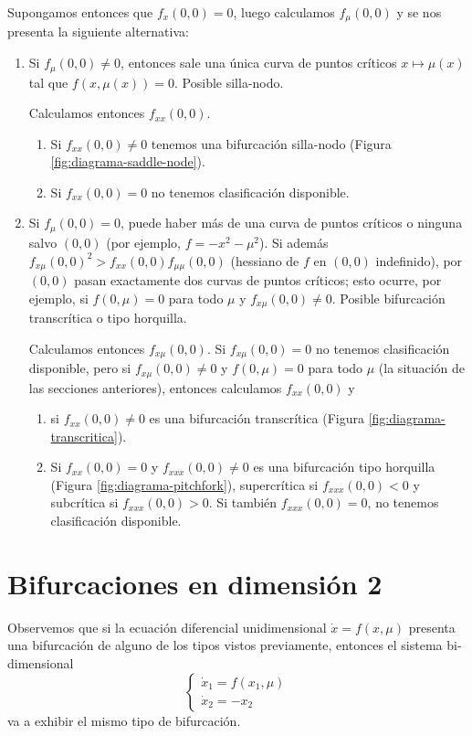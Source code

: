 \documentclass[12pt, a4paper]{amsbook}
\theoremstyle{remark}
\theoremstyle{definition}
\numberwithin{section}{chapter}
\numberwithin{subsection}{section}
\numberwithin{equation}{section}
\numberwithin{figure}{chapter}
\begin{document}
Supongamos entonces que $f_x(0,0)=0$, luego calculamos $f_\mu(0,0)$ y se nos presenta la siguiente alternativa:
\begin{enumerate}
\item Si $f_\mu(0,0)\neq 0$, entonces sale una única curva de puntos críticos $x\mapsto\mu(x)$ tal que $f(x,\mu(x))=0$. Posible silla-nodo.

Calculamos entonces $f_{xx}(0,0)$.
\begin{enumerate}
\item Si $f_{xx}(0,0)\neq 0$ tenemos una bifurcación silla-nodo (Figura \ref{fig:diagrama-saddle-node}).

\item Si $f_{xx}(0,0)=0$ no tenemos clasificación disponible.
\end{enumerate}

\item Si $f_\mu(0,0)=0$, puede haber más de una curva de puntos críticos o ninguna salvo $(0,0)$ (por ejemplo, $f=-x^2-\mu^2$). Si además $f_{x\mu}(0,0)^2>f_{xx}(0,0)f_{\mu\mu}(0,0)$ (hessiano de $f$ en $(0,0)$ indefinido), por $(0,0)$ pasan exactamente dos curvas de puntos críticos; esto ocurre, por ejemplo, si $f(0,\mu)=0$ para todo $\mu$ y $f_{x\mu}(0,0)\neq0$. Posible bifurcación transcrítica o tipo horquilla.

Calculamos entonces $f_{x\mu}(0,0)$. Si $f_{x\mu}(0,0)=0$ no tenemos clasificación disponible, pero si $f_{x\mu}(0,0)\neq 0$ y $f(0,\mu)=0$ para todo $\mu$ (la situación de las secciones anteriores), entonces calculamos $f_{xx}(0,0)$ y
\begin{enumerate}
\item si $f_{xx}(0,0)\neq 0$ es una bifurcación transcrítica (Figura \ref{fig:diagrama-transcritica}).
\item Si $f_{xx}(0,0)=0$ y $f_{xxx}(0,0)\neq0$ es una bifurcación tipo horquilla (Figura \ref{fig:diagrama-pitchfork}), supercrítica si $f_{xxx}(0,0)<0$ y subcrítica si $f_{xxx}(0,0)>0$. Si también $f_{xxx}(0,0)=0$, no tenemos clasificación disponible.
\end{enumerate}
\end{enumerate}

\section{Bifurcaciones en dimensión 2}
Observemos que si la ecuación diferencial unidimensional $\dot x = f(x,\mu)$ presenta una bifurcación de alguno de los tipos vistos previamente, entonces el sistema bi-dimensional
$$
\begin{cases}
\dot x_1 = f(x_1,\mu)\\
\dot x_2 = -x_2
\end{cases}
$$
va a exhibir el mismo tipo de bifurcación. 
\end{document}
